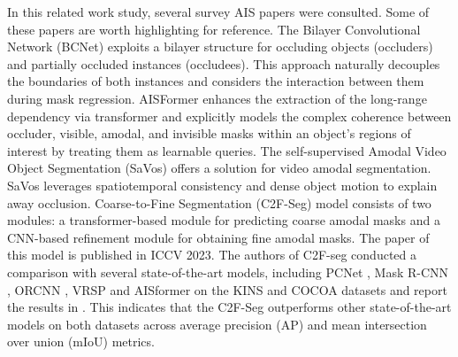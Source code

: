 In this related work study, several survey AIS papers were consulted. Some of these papers are worth highlighting for reference. The Bilayer Convolutional Network (BCNet) \cite{bcnet} exploits a bilayer structure for occluding objects (occluders) and partially occluded instances (occludees). This approach naturally decouples the boundaries of both instances and considers the interaction between them during mask regression. AISFormer \cite{aisformer} enhances the extraction of the long-range dependency via transformer and explicitly models the complex coherence between occluder, visible, amodal, and invisible masks within an object's regions of interest by treating them as learnable queries. The self-supervised Amodal Video Object Segmentation (SaVos) \cite{savos} offers a solution for video amodal segmentation. SaVos leverages spatiotemporal consistency and dense object motion to explain away occlusion. Coarse-to-Fine Segmentation (C2F-Seg) \cite{c2fseg} model consists of two modules: a transformer-based module for predicting coarse amodal masks and a CNN-based refinement module for obtaining fine amodal masks. The paper of this model is published in ICCV 2023. The authors of C2F-seg conducted a comparison with several state-of-the-art models, including PCNet \cite{PCNet}, Mask R-CNN \cite{maskRCNN}, ORCNN \cite{ORCNN}, VRSP \cite{VRSP} and AISformer on the KINS and COCOA datasets and report the results in . This indicates that the C2F-Seg outperforms other state-of-the-art models on both datasets across average precision (AP) and mean intersection over union (mIoU) metrics.

